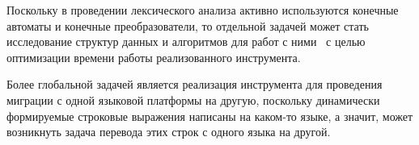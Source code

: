 \documentclass{matmex-diploma}
\begin{document}
Поскольку в проведении лексического анализа активно используются конечные автоматы и конечные преобразователи, то отдельной задачей может стать исследование структур данных и алгоритмов для работ с ними~\cite{AlgoFSA} с целью оптимизации времени работы реализованного инструмента. 

Более глобальной задачей является реализация инструмента для проведения миграции с одной языковой платформы на другую, поскольку динамически формируемые строковые выражения написаны на каком-то языке, а значит, может возникнуть задача перевода этих строк с одного языка на другой. 



\end{document}

